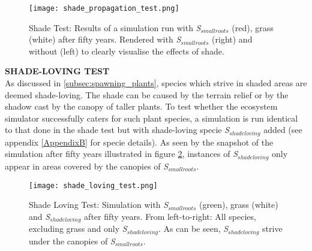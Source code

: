 \begin{figure}
\center
	\texttt{[image: shade\_propagation\_test.png]}
	\caption{ Shade Test: Results of a simulation run with \textit{S$_{smallroots}$} (red), grass (white) after fifty years. Rendered with \textit{S$_{smallroots}$} (right) and without (left) to clearly visualise the effects of shade.}
	\label{fig:shade_test}
\end{figure}

\textbf{SHADE-LOVING TEST}\\

As discussed in \ref{subsec:spawning_plants}, species which strive in shaded areas are deemed shade-loving. The shade can be caused by the terrain relief or by the shadow cast by the canopy of taller plants. To test whether the ecosystem simulator successfully caters for such plant species, a simulation is run identical to that done in the shade test but with shade-loving specie \textit{S$_{shadeloving}$} added (see appendix \ref{AppendixB} for specie details). As seen by the snapshot of the simulation after fifty years illustrated in figure \ref{fig:shade_loving_test}, instances of \textit{S$_{shadeloving}$} only appear in areas covered by the canopies of \textit{S$_{smallroots}$}.

\begin{figure}
\center
	\texttt{[image: shade\_loving\_test.png]}
	\caption{ Shade Loving Test: Simulation with \textit{S$_{smallroots}$} (green), grass (white) and \textit{S$_{shadeloving}$} after fifty years. From left-to-right: All species, excluding grass and only \textit{S$_{shadeloving}$}. As can be seen, \textit{S$_{shadeloving}$} strive under the canopies of \textit{S$_{smallroots}$}.}
	\label{fig:shade_loving_test}
\end{figure}
